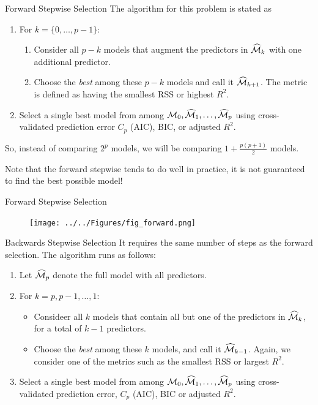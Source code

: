 \documentclass{beamer}
\begin{document}
\begin{frame}{Forward Stepwise Selection}
	The algorithm for this problem is stated as
	\begin{enumerate}
		\item For $k=\{0,\ldots, p-1\}$:
		\begin{enumerate}
			\item Consider all $p-k$ models that augment the predictors in $\widehat{\cal M}_k$ with one additional predictor.
			\item Choose the {\it best} among these $p-k$ models and call it $\widehat{\cal M}_{k+1}$. The metric is defined as having the smallest RSS or highest $R^2$.
		\end{enumerate}
	\item Select a single best model from among ${\cal M}_0,\widehat{\cal M}_1,\ldots, \widehat{\cal M}_p$ using cross-validated prediction error $C_p$ (AIC), BIC, or adjusted $R^2$.
		\end{enumerate}
	So, instead of comparing $2^p$ models, we will be comparing $1 + \frac{p(p+1)}{2}$ models. 
	
	Note that the forward stepwise tends to do well in practice, it is not guaranteed to find the best possible model!

\end{frame}

\begin{frame}{Forward Stepwise Selection}
	
	 \begin{figure}[h]
		\centering
		\texttt{[image: ../../Figures/fig\_forward.png]}
	\end{figure}
\end{frame}

\begin{frame}{Backwards Stepwise Selection}
	It requires the same number of steps as the forward selection. The algorithm runs as follows:
	
	\begin{enumerate}
		\item Let $\widehat{\cal M}_p$  denote the full model with all predictors.
		\item For $k=p,p-1,\ldots,1$:
		\begin{itemize}
			\item Consideer all $k$ models that contain all but one of the predictors in $\widehat{\cal M}_k$, for a total of $k-1$ predictors.
			\item Choose the {\it best} among these $k$ models, and call it $\widehat{\cal M}_{k-1}$. Again, we consider one of the metrics such as the smallest RSS or largest $R^2$.
		\end{itemize}
	 \item Select a single best model from among ${\cal M}_0,\widehat{\cal M}_1, \ldots, \widehat{\cal M}_p$ using cross-validated prediction error, $C_p$ (AIC), BIC or adjusted $R^2$.
	\end{enumerate}
\end{frame}
\end{document}
